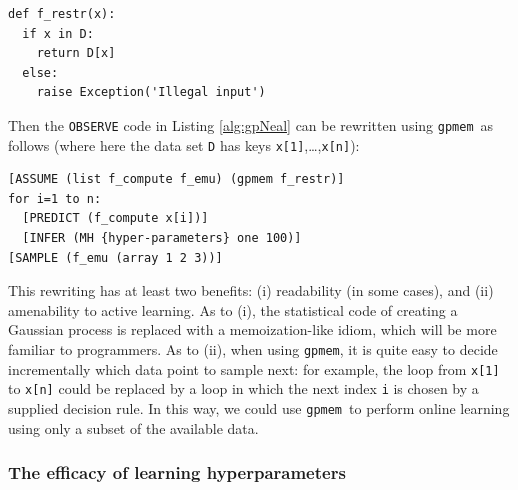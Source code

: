 \documentclass{article} %
\newcommand{\gpmem}{\texttt{gpmem}}
\begin{document}
\begin{minipage}{8cm}
\begin{verbatim}
def f_restr(x):
  if x in D:
    return D[x]
  else:
    raise Exception('Illegal input')
\end{verbatim}
\end{minipage}

Then the \texttt{OBSERVE} code in Listing \ref{alg:gpNeal} can be rewritten using \gpmem\ as follows (where here the data set \texttt{D} has keys \texttt{x[1]},\ldots,\texttt{x[n]}):

\begin{minipage}{10cm}
\begin{verbatim}
[ASSUME (list f_compute f_emu) (gpmem f_restr)]
for i=1 to n:
  [PREDICT (f_compute x[i])]
  [INFER (MH {hyper-parameters} one 100)]
[SAMPLE (f_emu (array 1 2 3))]
\end{verbatim}
\end{minipage}

This rewriting has at least two benefits: (i) readability (in some cases), and (ii) amenability to active learning.
As to (i), the statistical code of creating a Gaussian process is replaced with a memoization-like idiom, which will be more familiar to programmers.
As to (ii), when using \gpmem, it is quite easy to decide incrementally which data point to sample next: for example, the loop from \texttt{x[1]} to \texttt{x[n]} could be replaced by a loop in which the next index \texttt{i} is chosen by a supplied decision rule.
In this way, we could use \gpmem\ to perform online learning using only a subset of the available data.

\subsubsection{The efficacy of learning hyperparameters}
\end{document}
